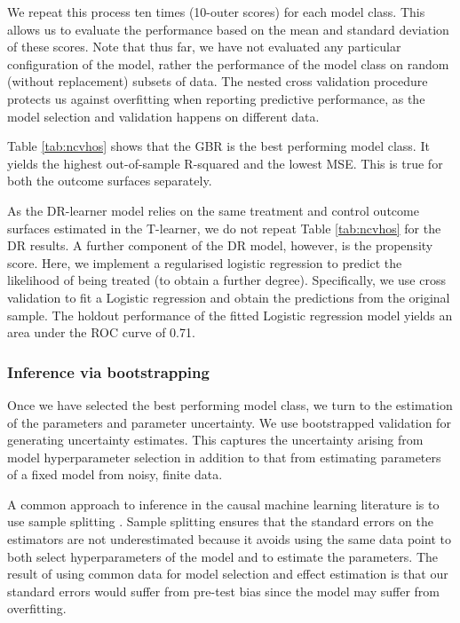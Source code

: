 \documentclass[12pt, a4paper]{article}
\begin{document}
We repeat this process ten times (10-outer scores) for each model class. This
allows us to evaluate the performance based on the mean and standard deviation
of these scores. Note that thus far, we have not evaluated any particular
configuration of the model, rather the performance of the model class on random
(without replacement) subsets of data. The nested cross validation procedure
protects us against overfitting when reporting predictive performance, as the
model selection and validation happens on different data.

Table \ref{tab:ncvhos} shows that the GBR is the best performing model class.
It yields the highest out-of-sample R-squared and the lowest MSE. This is true
for both the outcome surfaces separately.

As the DR-learner model relies on the same treatment and control outcome surfaces estimated in the T-learner, we do not repeat Table \ref{tab:ncvhos} for the DR results. A further component of the DR model, however, is the propensity score. Here, we implement a regularised logistic regression to predict the likelihood of being treated (to obtain a further degree). Specifically, we use cross validation to fit a Logistic regression and obtain the predictions from the original sample. The holdout performance of the fitted Logistic regression model yields an area under the ROC curve of 0.71.

\subsubsection*{Inference via bootstrapping}

Once we have selected the best performing model class, we turn to the
estimation of the parameters and parameter uncertainty. We use bootstrapped
validation for generating uncertainty estimates. This captures the uncertainty
arising from model hyperparameter selection in addition to that from estimating
parameters of a fixed model from noisy, finite data. 


A common approach to inference in the causal machine learning literature is to
use sample splitting \citep{athey2019}. Sample splitting ensures that the
standard errors on the estimators are not underestimated because it avoids
using the same data point to both select hyperparameters of the model and to
estimate the parameters. 
The result of using common data for model selection and effect estimation is
that our standard errors would suffer from pre-test bias since the model may
suffer from overfitting.
\end{document}
